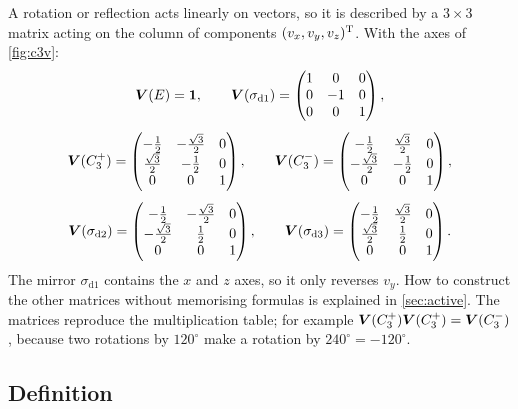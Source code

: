 A rotation or reflection acts linearly on vectors, so it is described by a
$3\times3$ matrix acting on the column of components $(v_x,v_y,v_z)^{\mathrm{T}}$. With the axes
of \cref{fig:c3v}:
\begin{equation}\label{eq:VC3v}
\begin{gathered}
\bm{V}(E)=\bm{1},\qquad
\bm{V}(\sigma_{\mathrm{d}1})=\begin{pmatrix}1&0&0\\0&-1&0\\0&0&1\end{pmatrix},\\[4pt]
\bm{V}(C_3^{+})=\begin{pmatrix}-\frac12&-\frac{\sqrt3}{2}&0\\ \frac{\sqrt3}{2}&-\frac12&0\\0&0&1\end{pmatrix},\qquad
\bm{V}(C_3^{-})=\begin{pmatrix}-\frac12&\frac{\sqrt3}{2}&0\\ -\frac{\sqrt3}{2}&-\frac12&0\\0&0&1\end{pmatrix},\\[4pt]
\bm{V}(\sigma_{\mathrm{d}2})=\begin{pmatrix}-\frac12&-\frac{\sqrt3}{2}&0\\ -\frac{\sqrt3}{2}&\frac12&0\\0&0&1\end{pmatrix},\qquad
\bm{V}(\sigma_{\mathrm{d}3})=\begin{pmatrix}-\frac12&\frac{\sqrt3}{2}&0\\ \frac{\sqrt3}{2}&\frac12&0\\0&0&1\end{pmatrix}.
\end{gathered}
\end{equation}
The mirror $\sigma_{\mathrm{d}1}$ contains the $x$ and $z$ axes, so it only reverses
$v_y$. How to construct the other matrices without memorising formulas is explained
in \cref{sec:active}. The matrices reproduce the multiplication table; for example
$\bm{V}(C_3^+)\bm{V}(C_3^+)=\bm{V}(C_3^-)$, because two rotations by $120^\circ$
make a rotation by $240^\circ=-120^\circ$.

\subsection{Definition}

